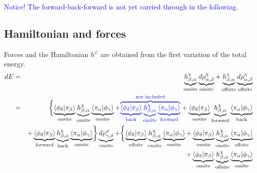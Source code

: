 \documentclass[11pt,a4paper]{report}
\begin{document}
\textcolor{blue}{Notice! The forward-back-forward is not yet carried
  through in the following.}



\subsection{Hamiltonian and forces}

Forces and the Hamiltonian $h^{\varphi}$ are obtained from the first
variation of the total energy.
\begin{eqnarray}
dE&=&
\underbrace{h^{\chi}_{\beta,\alpha}}_{\text{onsite}}
\underbrace{d\rho^{\chi}_{\alpha,\beta}}_{\text{onsite}}
+
\underbrace{h^{\chi}_{\beta,\alpha}}_{\text{offsite}}
\underbrace{d\rho^{\chi}_{\alpha,\beta}}_{\text{offsite}}
\nonumber\\
%
%
%
&=&
\biggl\lbrace
\underbrace{\langle\phi_\delta|\pi_\beta\rangle}_{\text{onsite}}
\underbrace{h^{\chi}_{\beta,\alpha}}_{\text{onsite}}
\underbrace{\langle\pi_\alpha|\phi_\gamma\rangle}_{\text{onsite}}
+
\textcolor{blue}{\overbrace{
\underbrace{\langle\phi_\delta|\pi_\beta\rangle}_{\text{back}}
\underbrace{h^{\chi}_{\beta,\alpha}}_{\text{onsite}}
\underbrace{\langle\pi_\alpha|\phi_\gamma\rangle}_{\text{forward}}
}^{\text{not included}}}
+
\underbrace{\langle\phi_\delta|\pi_\beta\rangle}_{\text{onsite}}
\underbrace{h^{\chi}_{\beta,\alpha}}_{\text{forward}}
\underbrace{\langle\pi_\alpha|\phi_\gamma\rangle}_{\text{back}}
\nonumber\\
&&+
\underbrace{\langle\phi_\delta|\pi_\beta\rangle}_{\text{forward}}
\underbrace{h^{\chi}_{\beta,\alpha}}_{\text{back}}
\underbrace{\langle\pi_\alpha|\phi_\gamma\rangle}_{\text{onsite}}
\biggr\rbrace
\underbrace{d\rho^{\varphi}_{\gamma,\delta}}_{\text{onsite}}
+
\biggl\lbrace
\underbrace{\langle\phi_\delta|\pi_\beta\rangle}_{\text{offsite}}
\underbrace{h^{\chi}_{\beta,\alpha}}_{\text{onsite}}
\underbrace{\langle\pi_\alpha|\phi_\gamma\rangle}_{\text{onsite}}
+
\underbrace{\langle\phi_\delta|\pi_\beta\rangle}_{\text{onsite}}
\underbrace{h^{\chi}_{\beta,\alpha}}_{\text{onsite}}
\underbrace{\langle\pi_\alpha|\phi_\gamma\rangle}_{\text{offsite}}
\nonumber\\
&&+
\underbrace{\langle\phi_\delta|\pi_\beta\rangle}_{\text{onsite}}
\underbrace{h^{\chi}_{\beta,\alpha}}_{\text{offsite}}
\underbrace{\langle\pi_\alpha|\phi_\gamma\rangle}_{\text{onsite}}

\end{eqnarray}
\end{document}

